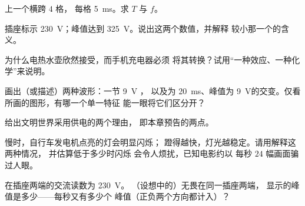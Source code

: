 \begin{exercise}[$\star$]\label{exo:g9:alternating-current:4}
上一个横跨 $4$ 格，
每格 \qty{5}{ms}。求 $T$ 与 $f$。
\end{exercise}

\begin{exercise}[$\star$]\label{exo:g9:alternating-current:5}
插座标示 \qty{230}{V}；峰值达到
\qty{325}{V}。说出这两个数值，并解释
较小那一个的含义。
\end{exercise}

\begin{exercise}[$\star$]\label{exo:g9:alternating-current:6}
为什么电热水壶欣然接受，而手机充电器必须
将其转换？试用“一种效应、一种化学”来说明。
\end{exercise}

\begin{exercise}[$\star$]\label{exo:g9:alternating-current:7}
画出（或描述）两种波形：一节 \qty{9}{V} ，
以及为 \qty{20}{ms}、峰值为
\qty{9}{V}的交变。仅看所画的图形，有哪一个单一特征
能一眼将它们区分开？
\end{exercise}

\begin{exercise}[$\star$]\label{exo:g9:alternating-current:8}
给出文明世界采用供电的两个理由，
即本章预告的两点。
\end{exercise}

\begin{exercise}[$\star\star$]\label{exo:g9:alternating-current:9}
慢时，自行车发电机点亮的灯会明显闪烁；
蹬得越快，灯光越稳定。请用解释这两种情况，
并估算低于多少时闪烁
会令人烦扰，已知电影约以
每秒 $24$ 幅画面骗过人眼。
\end{exercise}

\begin{exercise}[$\star\star$]\label{exo:g9:alternating-current:10}
在插座两端的交流读数为 \qty{230}{V}。
（设想中的）无畏在同一插座两端，
显示的峰值是多少——每秒又有多少个
峰值（正负两个方向都计入）？
\end{exercise}

